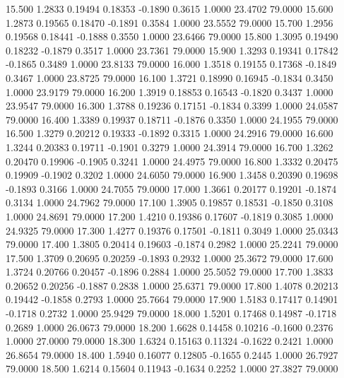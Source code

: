   15.500   1.2833   0.19494   0.18353  -0.1890   0.3615   1.0000  23.4702  79.0000
  15.600   1.2873   0.19565   0.18470  -0.1891   0.3584   1.0000  23.5552  79.0000
  15.700   1.2956   0.19568   0.18441  -0.1888   0.3550   1.0000  23.6466  79.0000
  15.800   1.3095   0.19490   0.18232  -0.1879   0.3517   1.0000  23.7361  79.0000
  15.900   1.3293   0.19341   0.17842  -0.1865   0.3489   1.0000  23.8133  79.0000
  16.000   1.3518   0.19155   0.17368  -0.1849   0.3467   1.0000  23.8725  79.0000
  16.100   1.3721   0.18990   0.16945  -0.1834   0.3450   1.0000  23.9179  79.0000
  16.200   1.3919   0.18853   0.16543  -0.1820   0.3437   1.0000  23.9547  79.0000
  16.300   1.3788   0.19236   0.17151  -0.1834   0.3399   1.0000  24.0587  79.0000
  16.400   1.3389   0.19937   0.18711  -0.1876   0.3350   1.0000  24.1955  79.0000
  16.500   1.3279   0.20212   0.19333  -0.1892   0.3315   1.0000  24.2916  79.0000
  16.600   1.3244   0.20383   0.19711  -0.1901   0.3279   1.0000  24.3914  79.0000
  16.700   1.3262   0.20470   0.19906  -0.1905   0.3241   1.0000  24.4975  79.0000
  16.800   1.3332   0.20475   0.19909  -0.1902   0.3202   1.0000  24.6050  79.0000
  16.900   1.3458   0.20390   0.19698  -0.1893   0.3166   1.0000  24.7055  79.0000
  17.000   1.3661   0.20177   0.19201  -0.1874   0.3134   1.0000  24.7962  79.0000
  17.100   1.3905   0.19857   0.18531  -0.1850   0.3108   1.0000  24.8691  79.0000
  17.200   1.4210   0.19386   0.17607  -0.1819   0.3085   1.0000  24.9325  79.0000
  17.300   1.4277   0.19376   0.17501  -0.1811   0.3049   1.0000  25.0343  79.0000
  17.400   1.3805   0.20414   0.19603  -0.1874   0.2982   1.0000  25.2241  79.0000
  17.500   1.3709   0.20695   0.20259  -0.1893   0.2932   1.0000  25.3672  79.0000
  17.600   1.3724   0.20766   0.20457  -0.1896   0.2884   1.0000  25.5052  79.0000
  17.700   1.3833   0.20652   0.20256  -0.1887   0.2838   1.0000  25.6371  79.0000
  17.800   1.4078   0.20213   0.19442  -0.1858   0.2793   1.0000  25.7664  79.0000
  17.900   1.5183   0.17417   0.14901  -0.1718   0.2732   1.0000  25.9429  79.0000
  18.000   1.5201   0.17468   0.14987  -0.1718   0.2689   1.0000  26.0673  79.0000
  18.200   1.6628   0.14458   0.10216  -0.1600   0.2376   1.0000  27.0000  79.0000
  18.300   1.6324   0.15163   0.11324  -0.1622   0.2421   1.0000  26.8654  79.0000
  18.400   1.5940   0.16077   0.12805  -0.1655   0.2445   1.0000  26.7927  79.0000
  18.500   1.6214   0.15604   0.11943  -0.1634   0.2252   1.0000  27.3827  79.0000
